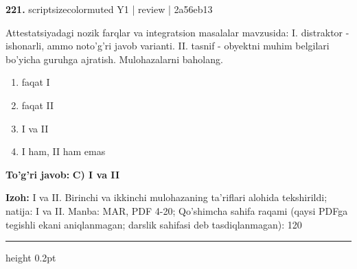 \documentclass[10pt,a4paper]{article}
\begin{document}
{\bfseries\sffamily\color{ink} 221.} {scriptsizecolor{muted} Y1 | review | 2a56eb13}
\par
Attestatsiyadagi nozik farqlar va integratsion masalalar mavzusida: I. distraktor - ishonarli, ammo noto'g'ri javob varianti. II. tasnif - obyektni muhim belgilari bo'yicha guruhga ajratish. Mulohazalarni baholang.
\begin{enumerate}[label=\Alph*),leftmargin=9mm]
\item faqat I
\item faqat II
\item I va II
\item I ham, II ham emas
\end{enumerate}
\begin{tcolorbox}[enhanced,breakable,colback=teal!4,colframe=teal!60!black,boxrule=0.45pt,arc=1.2mm,left=2.7mm,right=2.7mm,top=1.8mm,bottom=1.8mm,before skip=2mm,after skip=2mm]
{\bfseries\sffamily\color{teal}To'g'ri javob:} \textbf{C) I va II}
\par\smallskip
{\bfseries Izoh:} I va II. Birinchi va ikkinchi mulohazaning ta'riflari alohida tekshirildi; natija: I va II. Manba: MAR, PDF 4-20; Qo'shimcha sahifa raqami (qaysi PDFga tegishli ekani aniqlanmagan; darslik sahifasi deb tasdiqlanmagan): 120
\end{tcolorbox}
\vspace{2mm}\hrule height 0.2pt\vspace{3mm}
\end{document}
